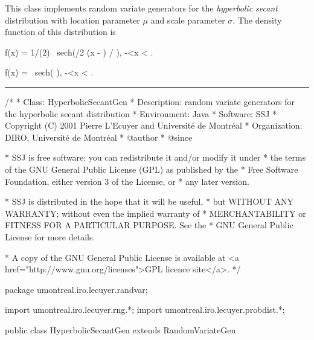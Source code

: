 
This class implements random variate generators for the 
 {\em hyperbolic secant\/} distribution with location
 parameter $\mu$ and scale parameter $\sigma$.
The density function of this distribution is
\begin{htmlonly}
\eq
   f(x) = 1/(2\sigma) \mbox{ sech}(\pi/2 (x - \mu) / \sigma),
   \qquad -\infty <x < \infty.
\endeq
\end{htmlonly}%
\begin{latexonly}%
\eq
   f(x) =  \mbox{ sech}\left( \right),  \qquad -\infty <x < \infty.
\endeq
\end{latexonly}%

\bigskip\hrule

\begin{code}
\begin{hide}
/*
 * Class:        HyperbolicSecantGen
 * Description:  random variate generators for the hyperbolic secant distribution
 * Environment:  Java
 * Software:     SSJ 
 * Copyright (C) 2001  Pierre L'Ecuyer and Université de Montréal
 * Organization: DIRO, Université de Montréal
 * @author       
 * @since

 * SSJ is free software: you can redistribute it and/or modify it under
 * the terms of the GNU General Public License (GPL) as published by the
 * Free Software Foundation, either version 3 of the License, or
 * any later version.

 * SSJ is distributed in the hope that it will be useful,
 * but WITHOUT ANY WARRANTY; without even the implied warranty of
 * MERCHANTABILITY or FITNESS FOR A PARTICULAR PURPOSE.  See the
 * GNU General Public License for more details.

 * A copy of the GNU General Public License is available at
   <a href="http://www.gnu.org/licenses">GPL licence site</a>.
 */
\end{hide}
package umontreal.iro.lecuyer.randvar;\begin{hide}
import umontreal.iro.lecuyer.rng.*;
import umontreal.iro.lecuyer.probdist.*;
\end{hide}

public class HyperbolicSecantGen extends RandomVariateGen \begin{hide} {
   protected double mu;
   protected double sigma;

\end{hide}
\end{code}

